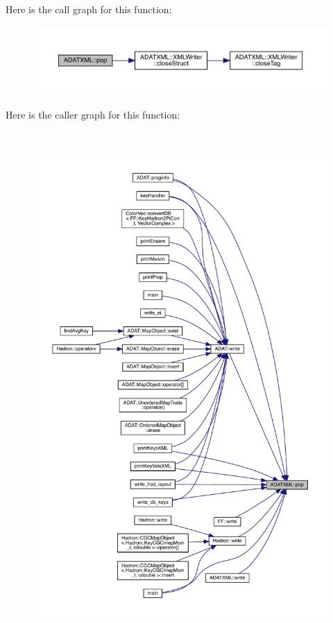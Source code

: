 Here is the call graph for this function\+:\nopagebreak
\begin{figure}[H]
\begin{center}
\leavevmode
\includegraphics[width=350pt]{d2/da3/group__io_gac235f191b977af85918b9a9d063ba5f4_cgraph}
\end{center}
\end{figure}
Here is the caller graph for this function\+:
\nopagebreak
\begin{figure}[H]
\begin{center}
\leavevmode
\includegraphics[height=550pt]{d2/da3/group__io_gac235f191b977af85918b9a9d063ba5f4_icgraph}
\end{center}
\end{figure}
\mbox{\label{group__io_gafc9d3fe6a9094c09371a9213eb4b6cdd}} 
